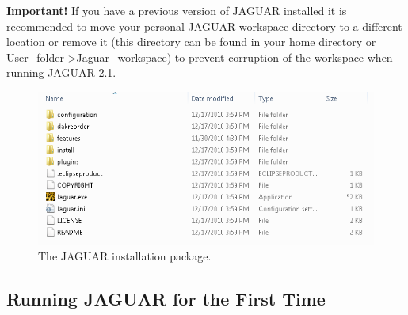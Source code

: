 \begin{itemize}
{\bf Important!} If you have a previous version of JAGUAR installed it
is recommended to move your personal JAGUAR workspace directory to a
different location or remove it (this directory can be found in your
home directory or User\_folder \textgreater Jaguar\_workspace) to
prevent corruption of the workspace when running JAGUAR 2.1.

\begin{figure}
  \centering
  \includegraphics[scale=0.6]{images/2_1jag_package}
  \caption{The JAGUAR installation package.}
  \label{fig:input:jag_package}
\end{figure}

\end{itemize}

\subsection{Running JAGUAR for the First Time}

